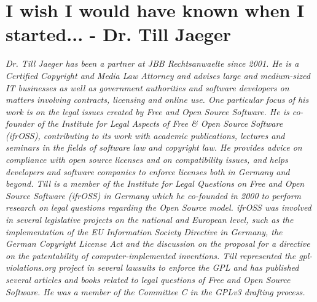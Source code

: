 \chapter{I wish I would have known when I started... - Dr. Till Jaeger} 

\textit{Dr. Till Jaeger has been a partner at JBB Rechtsanwaelte since 2001. He
is a Certified Copyright and Media Law Attorney and advises large and
medium-sized IT businesses as well as government authorities and software
developers on matters involving contracts, licensing and online use. One
particular focus of his work is on the legal issues created by Free and Open
Source Software. He is co-founder of the Institute for Legal Aspects of Free \&
Open Source Software (ifrOSS), contributing to its work with academic
publications, lectures and seminars in the fields of software law and copyright
law. He provides advice on compliance with open source licenses and on
compatibility issues, and helps developers and software companies to enforce
licenses both in Germany and beyond.
\newline
Till is a member of the Institute for Legal Questions on Free and Open Source
Software (ifrOSS) in Germany which he co-founded in 2000 to perform research on
legal questions regarding the Open Source model. ifrOSS was involved in several
legislative projects on the national and European level, such as the
implementation of the EU Information Society Directive in Germany, the German
Copyright License Act and the discussion on the proposal for a directive on the
patentability of computer-implemented inventions.
\newline
Till represented the gpl-violations.org project in several lawsuits to enforce
the GPL and has published several articles and books related to legal questions
of Free and Open Source Software. He was a member of the Committee C in the
GPLv3 drafting process.}

